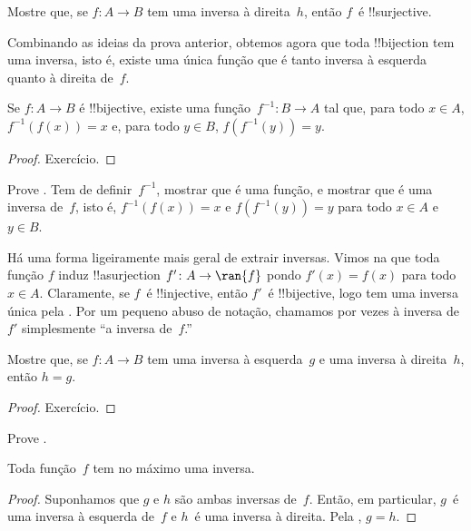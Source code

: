 \documentclass[../../../include/open-logic-section]{subfiles}
\begin{document}
\begin{prob}
Mostre que, se $f\colon A \to B$ tem uma inversa à direita~$h$, então $f$~é
!!{surjective}.
\end{prob}

\begin{explain}
  Combinando as ideias da prova anterior, obtemos agora que toda
  !!{bijection} tem uma inversa, isto é, existe uma única função
  que é tanto inversa à esquerda quanto à direita de~$f$.
\end{explain}

\begin{prop}
Se $f\colon A \to B$ é !!{bijective}, existe uma
função~$f^{-1}\colon B \to A$ tal que, para todo $x \in A$,
$f^{-1}(f(x)) = x$ e, para todo $y \in B$, $f(f^{-1}(y)) = y$.
\end{prop}

\begin{proof}
Exercício.
\end{proof}

\begin{prob}
Prove . Tem de
definir~$f^{-1}$, mostrar que é uma função, e mostrar que é uma
inversa de~$f$, isto é, $f^{-1}(f(x)) = x$ e $f(f^{-1}(y)) = y$ para
todo $x \in A$ e $y \in B$.
\end{prob}

\begin{explain}
Há uma forma ligeiramente mais geral de extrair inversas. Vimos na
 que toda função $f$ induz !!a{surjection} $f'
\colon A \to \ran{f}$ pondo $f'(x) = f(x)$ para todo $x \in A$.
Claramente, se $f$~é !!{injective}, então $f'$~é !!{bijective}, logo
tem uma inversa única pela . Por um
pequeno abuso de notação, chamamos por vezes à inversa de $f'$ simplesmente
``a inversa de~$f$.''
\end{explain}

\begin{prop}%
  Mostre que, se $f\colon A \to B$ tem uma inversa à esquerda~$g$ e uma
  inversa à direita~$h$, então $h = g$.
\end{prop}

\begin{proof}
  Exercício.
\end{proof}

\begin{prob}
  Prove .
\end{prob}

\begin{prop}
Toda função~$f$ tem no máximo uma inversa.
\end{prop}

\begin{proof}
  Suponhamos que $g$ e $h$ são ambas inversas de~$f$. Então, em particular,
  $g$~é uma inversa à esquerda de~$f$ e $h$~é uma inversa à direita. Pela
  , $g = h$.
\end{proof}
\end{document}

